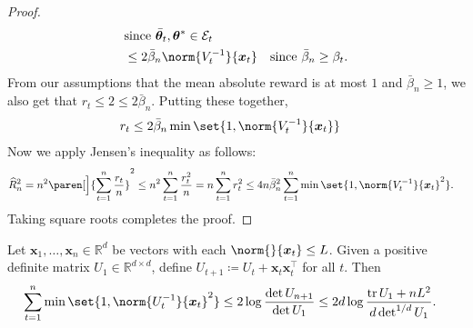 \documentclass{article}
\renewcommand{\vec}[1]{\bm{#1}}
\newcommand{\defeq}{\coloneq}
\newcommand{\inv}[1]{#1^{-1}}
\newcommand{\Real}{\mathds{R}}
\newcommand{\tr}{\operatorname{tr}}
\renewcommand{\det}{\operatorname{det}}
\DeclarePairedDelimiter{\paren}()
\providecommand\transp{\top}
\let\transpsymbol\transp
\renewcommand{\transp}[1]{#1^\transpsymbol}
\newcommand{\Eset}[1]{\mathcal{E}_{#1}}
\begin{document}
\begin{proof}
\begin{align*}
        &\text{since } \bar{\vec\theta}_t, \vec\theta^* \in \Eset{t} \\
        &\le 2\bar\beta_n\norm{\inv{V_t}}{\vec x_t}
        &\text{since } \bar\beta_n \ge \beta_t.
  \end{align*}
  From our assumptions that the mean absolute reward is at most $1$
  and $\bar\beta_n \ge 1$, we also get that $r_t \le 2 \le 2\bar\beta_n$.
  Putting these together,
  \begin{align}\label{eq:regret-bound-oneround}
    r_t &\le 2\bar\beta_n \min\set{1, \norm{\inv{V_t}}{\vec x_t}}
  \end{align}
  Now we apply Jensen's inequality as follows:
  \begin{align*}
    \widehat R_n^2 &= n^2 \paren[\Big]{\sum_{t=1}^n \frac{r_t}{n}}^2
                   \le n^2 \sum_{t=1}^n \frac{r_t^2}{n} = n\sum_{t=1}^nr_t^2
                   \le 4n\bar\beta_n^2\sum_{t=1}^n\min\set{1,\norm{\inv{V_t}}{\vec x_t}^2}.
  \end{align*}
  Taking square roots completes the proof.
\end{proof}

\begin{lemma}\label{lemma:elliptical-potential}
  Let $\vec x_1,\dotsc,\vec x_n \in \Real^d$ be vectors with each
  $\norm{}{\vec x_t} \le L$.  Given a positive definite matrix
  $U_1\in\Real^{d\times d}$, define
  $U_{t+1} \defeq U_t + \vec x_t \transp{\vec x_t}$ for all $t$.  Then
  \begin{align*}
    \sum_{t=1}^n\min\set{1, \norm{\inv{U_t}}{\vec x_t}^2}
    &\le 2\log\frac{\det U_{n+1}}{\det U_1}
      \le 2d\log\frac{\tr U_1+nL^2}{d\det^{1/d} U_1}.
  \end{align*}
\end{lemma}
\end{document}
